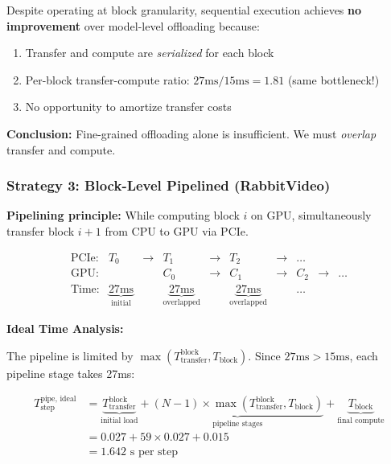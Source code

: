\begin{tcolorbox}[colback=yellow!10!white, colframe=orange!75!black, title=\textbf{Key Insight: Block-Level Without Pipelining Fails Too!}]
Despite operating at block granularity, sequential execution achieves \textbf{no improvement} over model-level offloading because:
\begin{enumerate}
    \item Transfer and compute are \textit{serialized} for each block
    \item Per-block transfer-compute ratio: $27\text{ms} / 15\text{ms} = 1.81$ (same bottleneck!)
    \item No opportunity to amortize transfer costs
\end{enumerate}

\textbf{Conclusion:} Fine-grained offloading alone is insufficient. We must \textit{overlap} transfer and compute.
\end{tcolorbox}

\subsubsection{Strategy 3: Block-Level Pipelined (RabbitVideo)}

\textbf{Pipelining principle:} While computing block $i$ on GPU, simultaneously transfer block $i+1$ from CPU to GPU via PCIe.

\begin{equation}
\boxed{
\begin{array}{ccccc}
\text{PCIe:} & T_0 & \to & T_1 & \to & T_2 & \to & \ldots \\
\text{GPU:} & & & C_0 & \to & C_1 & \to & C_2 & \to & \ldots \\
\text{Time:} & \underbrace{27\text{ms}}_{\text{initial}} & & \underbrace{27\text{ms}}_{\text{overlapped}} & & \underbrace{27\text{ms}}_{\text{overlapped}} & & \ldots
\end{array}
}
\end{equation}

\textbf{Ideal Time Analysis:}

The pipeline is limited by $\max(T_{\text{transfer}}^{\text{block}}, T_{\text{block}})$. Since $27\text{ms} > 15\text{ms}$, each pipeline stage takes 27ms:

\begin{align}
T_{\text{step}}^{\text{pipe, ideal}} &= \underbrace{T_{\text{transfer}}^{\text{block}}}_{\text{initial load}} + \underbrace{(N-1) \times \max(T_{\text{transfer}}^{\text{block}}, T_{\text{block}})}_{\text{pipeline stages}} + \underbrace{T_{\text{block}}}_{\text{final compute}} \nonumber \\
&= 0.027 + 59 \times 0.027 + 0.015 \nonumber \\
&= 1.642 \text{ s per step} \label{eq:pipe_ideal_time}
\end{align}

